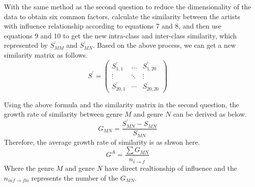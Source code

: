 \documentclass{mcmthesis}
\begin{document}
With the same method as the second question to reduce the dimensionality of the data to obtain six common factors, calculate the similarity between the artists with influence relationship according to equations 7 and 8, and then use equations 9 and 10 to get the new intra-class and inter-class similarity, which represented by $S_{MM}^{'}$ and $S_{MN}^{'}$. Based on the above process, we can get a new similarity matrix as follows.
\begin{equation}
S^{'} = \left( {\begin{array}{*{20}{c}}
	{S_{1,1}^{'}}& \ldots &{S_{1,20}^{'}}\\
	\vdots & \ddots & \vdots \\
	{S_{20,1}^{'}}& \cdots &{S_{20,20}^{'}}
	\end{array}} \right)
\end{equation}

Using the above formula and the similarity matrix in the second question, the growth rate of similarity between genre $M$ and genre $N$ can be derived as below.
\begin{equation}
G_{MN} = \frac{{S_{MN}^{'} - {S_{MN}}}}{{{S_{MN}}}}
\end{equation}
Therefore, the average growth rate of similarity is
as shwon here.
\begin{equation}
G^A = \frac{{\sum {{G_{MN}}} }}{{{n_{i \to f}}}}
\end{equation}
Where the genre $M$ and genre $N$ have direct realtionship of influence and the ${{n_{inf \to flo}}}$ represents the number of the ${{G_{MN}}}$.
\end{document}
